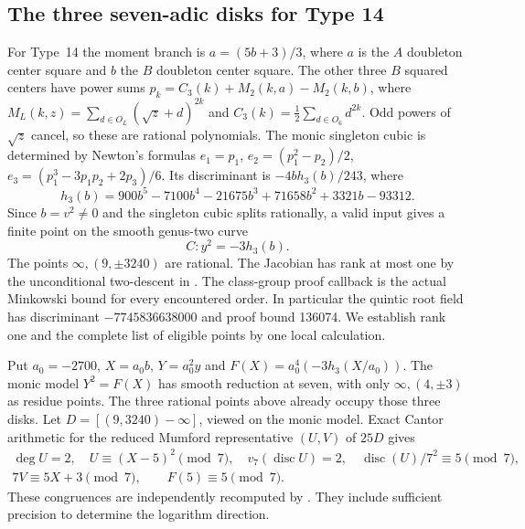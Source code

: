\subsection{The three seven-adic disks for Type 14}\label{detail:type14}
For Type~14 the moment branch is $a=(5b+3)/3$, where $a$ is the
$A$ doubleton center square and $b$ the $B$ doubleton center square.
The other three $B$ squared centers have power sums
$p_k=C_3(k)+M_2(k,a)-M_2(k,b)$, where
$M_L(k,z)=\sum_{d\in O_L}(\sqrt z+d)^{2k}$ and
$C_3(k)=\frac12\sum_{d\in O_6}d^{2k}$.
Odd powers of $\sqrt z$ cancel, so these are rational polynomials.
The monic singleton cubic is determined by Newton's formulas
$e_1=p_1$, $e_2=(p_1^2-p_2)/2$,
$e_3=(p_1^3-3p_1p_2+2p_3)/6$.
Its discriminant is
$-4bh_3(b)/243$, where
\[
 h_3(b)=900b^5-7100b^4-21675b^3+71658b^2+3321b-93312.
\]
Since $b=v^2\ne0$ and the singleton cubic splits rationally, a valid
input gives a finite point on the smooth genus-two curve
\[
 C:y^2=-3h_3(b).
\]
The points $\infty,(9,\pm3240)$ are rational. The Jacobian
has rank at most one by the unconditional two-descent in
. The class-group proof callback is
the actual Minkowski bound for every encountered order. In particular
the quintic root field has discriminant $-7745836638000$ and proof
bound 136074. We establish rank one and the complete list of eligible
points by one local calculation.

Put $a_0=-2700$, $X=a_0b$, $Y=a_0^2y$ and
$F(X)=a_0^4(-3h_3(X/a_0))$. The monic model $Y^2=F(X)$ has smooth
reduction at seven, with only $\infty,(4,\pm3)$ as residue points.
The three rational points above already occupy those three disks.
Let $D=[(9,3240)-\infty]$, viewed on the monic model. Exact Cantor
arithmetic for the reduced Mumford representative $(U,V)$ of $25D$
gives
\[
\begin{gathered}
 \deg U=2,\quad U\equiv(X-5)^2\pmod7,\quad
 v_7(\operatorname{disc}U)=2,\quad
 \operatorname{disc}(U)/7^2\equiv5\pmod7,\\
 7V\equiv5X+3\pmod7,\qquad F(5)\equiv5\pmod7.
\end{gathered}
\]
These congruences are independently recomputed by
. They include sufficient precision
to determine the logarithm direction.

